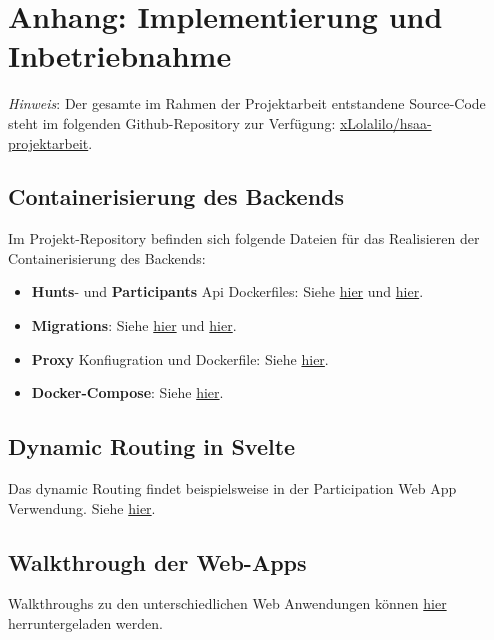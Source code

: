 \chapter{Anhang: Implementierung und Inbetriebnahme}

\textit{Hinweis}: Der gesamte im Rahmen der Projektarbeit entstandene Source-Code steht im folgenden Github-Repository zur Verfügung: \href{https://github.com/xLolalilo/hsaa-projektarbeit}{xLolalilo/hsaa-projektarbeit}.

\section{Containerisierung des Backends} \label{appendix:code:dockercompose}

Im Projekt-Repository befinden sich folgende Dateien für das Realisieren der Containerisierung des Backends:

\begin{itemize}
    \item \textbf{Hunts}- und \textbf{Participants} Api Dockerfiles: Siehe \href{https://github.com/xLolalilo/hsaa-projektarbeit/blob/develop/src/be-hunt-api/Hunts.Api/Dockerfile}{hier} und \href{https://github.com/xLolalilo/hsaa-projektarbeit/blob/develop/src/be-hunt-api/Participants.Api/Dockerfile}{hier}.
    \item \textbf{Migrations}: Siehe \href{https://github.com/xLolalilo/hsaa-projektarbeit/blob/develop/src/be-hunt-api/Hunts.Infrastructure/Dockerfile}{hier} und \href{https://github.com/xLolalilo/hsaa-projektarbeit/blob/develop/src/be-hunt-api/Participants.Infrastructure/Dockerfile}{hier}.
    \item \textbf{Proxy} Konfiugration und Dockerfile: Siehe \href{https://github.com/xLolalilo/hsaa-projektarbeit/tree/develop/src/be-hunt-api/Proxy}{hier}.
    \item \textbf{Docker-Compose}: Siehe \href{https://github.com/xLolalilo/hsaa-projektarbeit/blob/develop/src/be-hunt-api/docker-compose.yaml}{hier}.
\end{itemize}

\section{Dynamic Routing in Svelte} \label{appendix:code:dynamicrouting}

Das dynamic Routing findet beispielsweise in der Participation Web App Verwendung. Siehe \href{https://github.com/xLolalilo/hsaa-projektarbeit/tree/develop/src/fe-hunt-participation/src/routes/participation/%5BhuntId%5D}{hier}.

\section{Walkthrough der Web-Apps} \label{appendix:code:walkthrough}

Walkthroughs zu den unterschiedlichen Web Anwendungen können \href{https://github.com/xLolalilo/hsaa-projektarbeit/tree/develop/vids}{hier} herruntergeladen werden.
